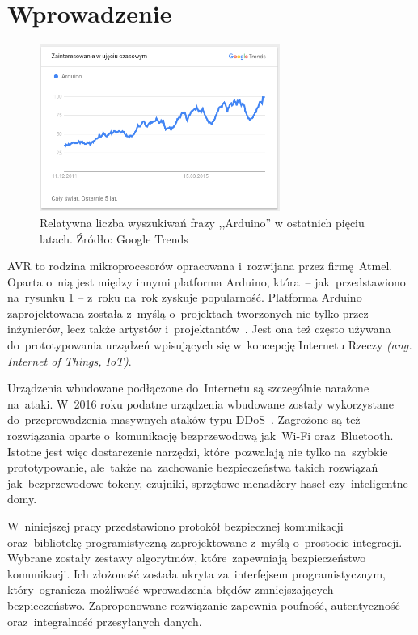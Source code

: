 \chapter*{Wprowadzenie}
\label{cha:wstep}

\begin{figure}[h]
\centering
\includegraphics[width=0.7\textwidth]{images/arduino-trends.png}
\caption{Relatywna liczba wyszukiwań frazy ,,Arduino'' w ostatnich pięciu latach. Źródło: Google Trends}
\label{fig:arduinotrends}
\end{figure}

AVR to rodzina mikroprocesorów opracowana i~rozwijana przez firmę Atmel. Oparta o~nią jest między innymi platforma Arduino, która~-- jak~przedstawiono na~rysunku \ref{fig:arduinotrends} -- z~roku na~rok zyskuje popularność. Platforma Arduino zaprojektowana została z~myślą o~projektach tworzonych nie tylko przez inżynierów, lecz także artystów i~projektantów~\cite{BanShi14}. Jest ona też często używana do~prototypowania urządzeń wpisujących się w~koncepcję Internetu Rzeczy \emph{(ang. Internet of Things, IoT)}.

Urządzenia wbudowane podłączone do~Internetu są szczególnie narażone na~ataki. W~2016 roku podatne urządzenia wbudowane zostały wykorzystane do~przeprowadzenia masywnych ataków typu DDoS~\cite{AkaIOT}. Zagrożone są też rozwiązania oparte o~komunikację bezprzewodową jak~Wi-Fi oraz~Bluetooth. Istotne jest więc dostarczenie narzędzi, które~pozwalają nie tylko na~szybkie prototypowanie, ale~także na~zachowanie bezpieczeństwa takich rozwiązań jak~bezprzewodowe tokeny, czujniki, sprzętowe menadżery haseł czy~inteligentne domy.

W~niniejszej pracy przedstawiono protokół bezpiecznej komunikacji oraz~bibliotekę programistyczną zaprojektowane z~myślą o~prostocie integracji. Wybrane zostały zestawy algorytmów, które~zapewniają bezpieczeństwo komunikacji. Ich złożoność została ukryta za~interfejsem programistycznym, który~ogranicza możliwość wprowadzenia błędów zmniejszających bezpieczeństwo. Zaproponowane rozwiązanie zapewnia poufność, autentyczność oraz~integralność przesyłanych danych.

